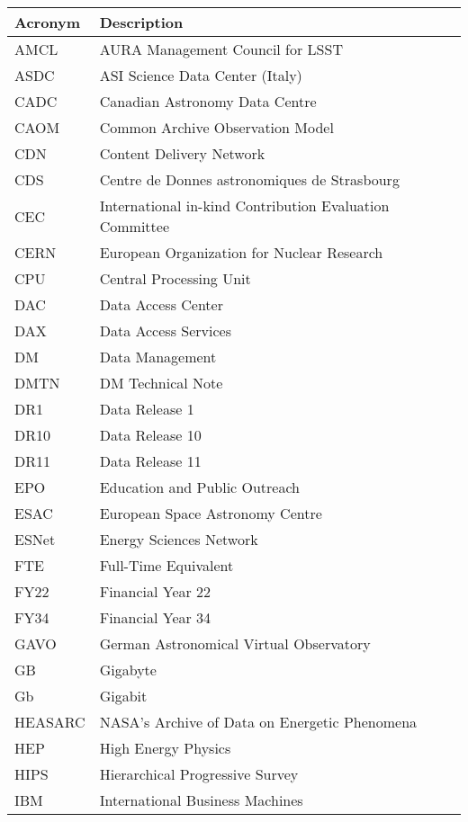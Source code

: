 \addtocounter{table}{-1}
\begin{longtable}{p{}p{}}\hline
\textbf{Acronym} & \textbf{Description}  \\\hline

AMCL & AURA Management Council for LSST \\\hline
ASDC & ASI Science Data Center (Italy) \\\hline
CADC & Canadian Astronomy Data Centre \\\hline
CAOM & Common Archive Observation Model \\\hline
CDN & Content Delivery Network \\\hline
CDS & Centre de Donnes astronomiques de Strasbourg \\\hline
CEC & International in-kind Contribution Evaluation Committee \\\hline
CERN & European Organization for Nuclear Research \\\hline
CPU & Central Processing Unit \\\hline
DAC & Data Access Center \\\hline
DAX & Data Access Services \\\hline
DM & Data Management \\\hline
DMTN & DM Technical Note \\\hline
DR1 & Data Release 1 \\\hline
DR10 & Data Release 10 \\\hline
DR11 & Data Release 11 \\\hline
EPO & Education and Public Outreach \\\hline
ESAC & European Space Astronomy Centre \\\hline
ESNet & Energy Sciences Network \\\hline
FTE & Full-Time Equivalent \\\hline
FY22 & Financial Year 22 \\\hline
FY34 & Financial Year 34 \\\hline
GAVO & German Astronomical Virtual Observatory \\\hline
GB & Gigabyte \\\hline
Gb & Gigabit \\\hline
HEASARC & NASA's Archive of Data on Energetic Phenomena \\\hline
HEP &  High Energy Physics \\\hline
HIPS & Hierarchical Progressive Survey \\\hline
IBM & International Business Machines \\\hline

\end{longtable}
